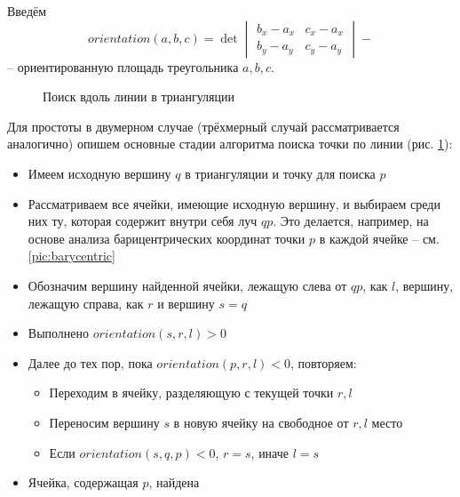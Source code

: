 Введём 
\begin{equation}
orientation(a, b, c) = \det{\begin{vmatrix}b_x - a_x & c_x - a_x \\
                                           b_y - a_y & c_y - a_y \end{vmatrix}} -
\end{equation}
-- ориентированную площадь треугольника $a, b, c$.

\begin{figure}
	\caption{Поиск вдоль линии в триангуляции \cite{line_walker}}
	\label{pic:line-walk}
\end{figure}

Для простоты в двумерном случае (трёхмерный случай рассматривается аналогично) опишем основные стадии алгоритма поиска точки по линии (рис. \ref{pic:line-walk}):
\begin{itemize}
\item Имеем исходную вершину $q$ в триангуляции и точку для поиска $p$
\item Рассматриваем все ячейки, имеющие исходную вершину, и выбираем среди них ту, которая содержит внутри себя луч $qp$. Это делается, например, на основе анализа барицентрических координат точки $p$ в каждой ячейке -- см. \ref{pic:barycentric}
\item Обозначим вершину найденной ячейки, лежащую слева от $qp$, как $l$, вершину, лежащую справа, как $r$ и вершину $s = q$
\item Выполнено $orientation(s, r, l) > 0$
\item Далее до тех пор, пока $orientation(p, r, l) < 0$, повторяем:
	\begin{itemize}
		\item Переходим в ячейку, разделяющую с текущей точки $r, l$
		\item Переносим вершину $s$ в новую ячейку на свободное от $r, l$ место
		\item Если $orientation(s, q, p) < 0$, $r = s$, иначе $l = s$
	\end{itemize}
\item Ячейка, содержащая $p$, найдена
\end{itemize}

